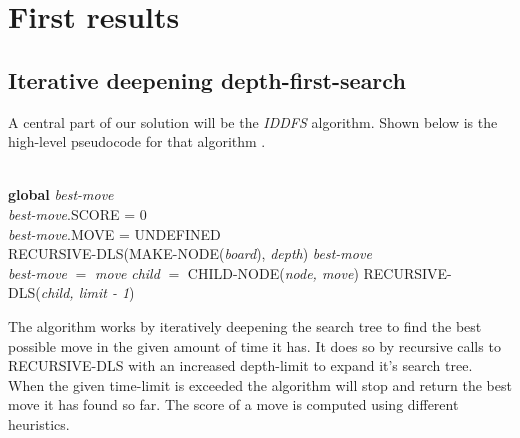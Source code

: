 \documentclass[a4paper,11pt]{article}
\begin{document}
\section{First results}


\subsection{Iterative deepening depth-first-search}
A central part of our solution will be the \emph{IDDFS} algorithm.
Shown below is the
high-level pseudocode for that algorithm \cite{aimodern}.\\
\begin{algorithmic}
 \\
\textbf{global} \emph{best-move} \\
\emph{best-move}.SCORE = 0 \\
\emph{best-move}.MOVE = UNDEFINED \\
\State RECURSIVE-DLS(MAKE-NODE(\emph{board}), \emph{depth})
\State \Return \emph{best-move}
\EndIf
\EndFor
\EndFunction
\\
\State \emph{best-move} $=$ \emph{move}
\EndIf
\State \emph{child} $=$ CHILD-NODE(\emph{node, move})
\State RECURSIVE-DLS(\emph{child, limit - 1})
\EndFor
\EndIf
\EndFunction
\end{algorithmic}

The algorithm works by iteratively deepening the search tree to find the best possible move in the given
amount of time it has. It does so by recursive calls to RECURSIVE-DLS with an increased depth-limit to expand
it's search tree. When the given time-limit is exceeded the algorithm will stop and return the best move it has
found so far. The score of a move is computed using different heuristics.




\end{document}
